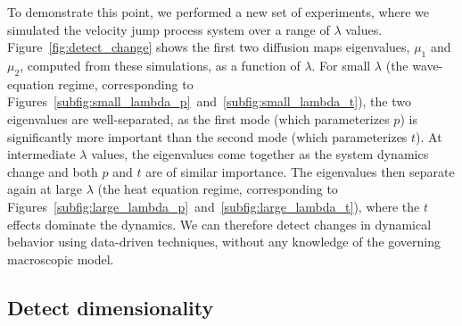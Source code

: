 \documentclass[preprint]{elsarticle}
\begin{document}
To demonstrate this point, we performed a new set of experiments, where we simulated the velocity jump process system over a range of $\lambda$ values. 
% 
Figure~\ref{fig:detect_change} shows the first two diffusion maps eigenvalues, $\mu_1$ and $\mu_2$, computed from these simulations, as a function of $\lambda$.
%
For small $\lambda$ (the wave-equation regime, corresponding to Figures~\ref{subfig:small_lambda_p}~and~\ref{subfig:small_lambda_t}), the two eigenvalues are well-separated, as the first mode (which parameterizes $p$) is significantly more important than the second mode (which parameterizes $t$).
%
At intermediate $\lambda$ values, the eigenvalues come together as the system dynamics change and both $p$ and $t$ are of similar importance.
%
The eigenvalues then separate again at large $\lambda$ (the heat equation regime, corresponding to Figures~\ref{subfig:large_lambda_p}~and~\ref{subfig:large_lambda_t}), where the $t$ effects dominate the dynamics.
%
We can therefore detect changes in dynamical behavior using data-driven techniques, without any knowledge of the governing macroscopic model. 




\subsection{Detect dimensionality}
\end{document}
